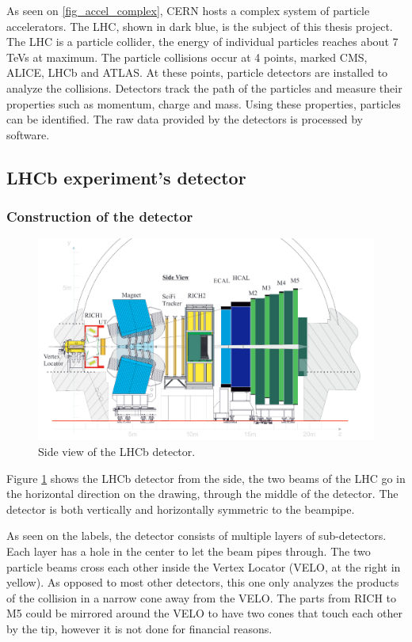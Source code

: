 \documentclass[12pt]{article}
\begin{document}
As seen on \ref{fig_accel_complex}, CERN hosts a complex system of particle accelerators.
The LHC, shown in dark blue, is the subject of this thesis project. The LHC is a particle collider, the energy of individual particles reaches about 7 TeVs at maximum. The particle collisions occur at 4 points, marked CMS, ALICE, LHCb and ATLAS. At these points, particle detectors are installed to analyze the collisions. Detectors track the path of the particles and measure their properties such as momentum, charge and mass. Using these properties, particles can be identified. The raw data provided by the detectors is processed by software.


\subsection{LHCb experiment's detector}\label{sec_lhcb_detector}	

\subsubsection{Construction of the detector}\label{sec_lhcb_det_constr}

\begin{figure}[H]
	\includegraphics[width=\textwidth]{lhcb_geometry_upgrade}
	\caption{Side view of the LHCb detector.}
	\label{fig_lhcb_geometry}
\end{figure}

Figure \ref{fig_lhcb_geometry} shows the LHCb detector from the side, the two beams of the LHC go in the horizontal direction on the drawing, through the middle of the detector. The detector is both vertically and horizontally symmetric to the beampipe.

As seen on the labels, the detector consists of multiple layers of sub-detectors. Each layer has a hole in the center to let the beam pipes through. The two particle beams cross each other inside the Vertex Locator (VELO, at the right in yellow). As opposed to most other detectors, this one only analyzes the products of the collision in a narrow cone away from the VELO. The parts from RICH to M5 could be mirrored around the VELO to have two cones that touch each other by the tip, however it is not done for financial reasons.
\end{document}
